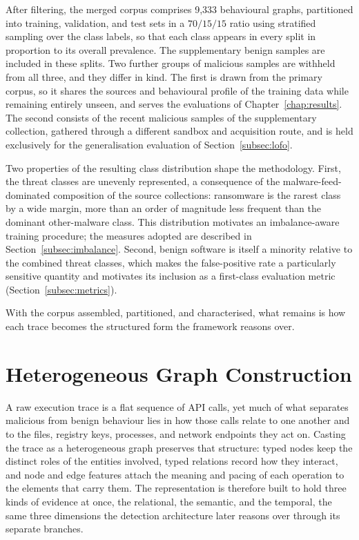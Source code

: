 \documentclass[%
    BCOR=10mm,
    DIV=13,
    toc=bibliography,
    toc=listof,
    oneside,
    12pt,
]{scrbook}
\begin{document}
After filtering, the merged corpus comprises 9{,}333 behavioural graphs,
partitioned into training, validation, and test sets in a $70/15/15$ ratio
using stratified sampling over the class labels, so that each class appears in
every split in proportion to its overall prevalence. The supplementary benign
samples are included in these splits. Two further groups of malicious samples
are withheld from all three, and they differ in kind. The first is drawn from
the primary corpus, so it shares the sources and behavioural profile of the
training data while remaining entirely unseen, and serves the evaluations of
Chapter~\ref{chap:results}. The second consists
of the recent malicious samples of the supplementary collection, gathered
through a different sandbox and acquisition route, and is held exclusively for
the generalisation evaluation of Section~\ref{subsec:lofo}.

Two properties of the resulting class distribution shape the methodology.
First, the threat classes are unevenly represented, a consequence of the
malware-feed-dominated composition of the source collections: ransomware is the
rarest class by a wide margin, more than an order of magnitude less frequent
than the dominant other-malware class. This distribution motivates an
imbalance-aware training procedure; the measures adopted are described in
Section~\ref{subsec:imbalance}.
Second, benign software is itself a minority relative to the combined threat
classes, which makes the false-positive rate a particularly sensitive quantity
and motivates its inclusion as a first-class evaluation metric
(Section~\ref{subsec:metrics}).

With the corpus assembled, partitioned, and characterised, what remains is how
each trace becomes the structured form the framework reasons over.

\section{Heterogeneous Graph Construction}
\label{sec:graph_construction}

A raw execution trace is a flat sequence of API calls, yet much of what
separates malicious from benign behaviour lies in how those calls relate to
one another and to the files, registry keys, processes, and network endpoints
they act on. Casting the trace as a heterogeneous graph preserves that
structure: typed nodes keep the distinct roles of the entities involved, typed
relations record how they interact, and node and edge features attach the
meaning and pacing of each operation to the elements that carry them. The
representation is therefore built to hold three kinds of evidence at once, the
relational, the semantic, and the temporal, the same three dimensions the
detection architecture later reasons over through its separate branches.
\end{document}
